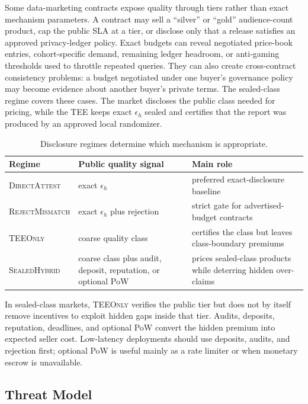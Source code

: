 \documentclass[conference]{IEEEtran}
\newcommand{\eps}{\epsilon}
\newcommand{\DirectAttest}{\textsc{DirectAttest}}
\newcommand{\RejectMismatch}{\textsc{RejectMismatch}}
\newcommand{\TEEOnly}{\textsc{TEEOnly}}
\newcommand{\Hybrid}{\textsc{SealedHybrid}}
\begin{document}
Some data-marketing contracts expose quality through tiers rather than exact mechanism parameters. A contract may sell a ``silver'' or ``gold'' audience-count product, cap the public SLA at a tier, or disclose only that a release satisfies an approved privacy-ledger policy. Exact budgets can reveal negotiated price-book entries, cohort-specific demand, remaining ledger headroom, or anti-gaming thresholds used to throttle repeated queries. They can also create cross-contract consistency problems: a budget negotiated under one buyer's governance policy may become evidence about another buyer's private terms. The sealed-class regime covers these cases. The market discloses the public class needed for pricing, while the TEE keeps exact $\eps_h$ sealed and certifies that the report was produced by an approved local randomizer.

\begin{table}[t]
\caption{Disclosure regimes determine which mechanism is appropriate.}
\label{tab:disclosure-regimes}
\centering
\scriptsize
\begin{tabularx}{\columnwidth}{p{}p{}X}
\toprule
Regime & Public quality signal & Main role \\
\midrule
\DirectAttest{} & exact $\eps_h$ & preferred exact-disclosure baseline \\
\RejectMismatch{} & exact $\eps_h$ plus rejection & strict gate for advertised-budget contracts \\
\TEEOnly{} & coarse quality class & certifies the class but leaves class-boundary premiums \\
\Hybrid{} & coarse class plus audit, deposit, reputation, or optional PoW & prices sealed-class products while deterring hidden over-claims \\
\bottomrule
\end{tabularx}
\end{table}

In sealed-class markets, \TEEOnly{} verifies the public tier but does not by itself remove incentives to exploit hidden gaps inside that tier. Audits, deposits, reputation, deadlines, and optional PoW convert the hidden premium into expected seller cost. Low-latency deployments should use deposits, audits, and rejection first; optional PoW is useful mainly as a rate limiter or when monetary escrow is unavailable.


\subsection{Threat Model}
\label{subsec:threat-model}
\end{document}
